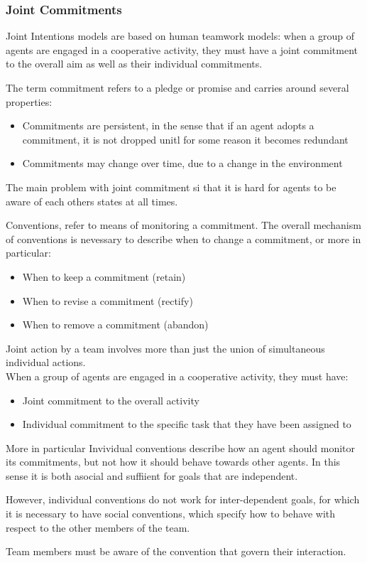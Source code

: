 \subsubsection{Joint Commitments}
Joint Intentions models are based on human teamwork models: when a group of agents are engaged in a cooperative activity, they must have a joint commitment to the overall aim as well as their individual commitments.

The term commitment refers to a pledge or promise and carries around several properties:
\begin{itemize}
\item Commitments are persistent, in the sense that if an agent adopts a commitment, it is not dropped unitl for some reason it becomes redundant
\item Commitments may change over time, due to a change in the environment
\end{itemize}
The main problem with joint commitment si that it is hard for agents to be aware of each others states at all times.

Conventions, refer to means of monitoring a commitment. The overall mechanism of conventions is nevessary to describe when to change a commitment, or more in particular:
\begin{itemize}
\item When to keep a commitment (retain)
\item When to revise a commitment (rectify)
\item When to remove a commitment (abandon)
\end{itemize}

Joint action by a team involves more than just the union of simultaneous individual actions.\\
When a group of agents are engaged in a cooperative activity, they must have:
\begin{itemize}
\item Joint commitment to the overall activity
\item Individual commitment to the specific task that they have been assigned to
\end{itemize}

More in particular Invividual conventions describe how an agent should monitor its commitments, but not how it should behave towards other agents. In this sense it is both asocial and suffiient for goals that are independent.

However, individual conventions do not work for inter-dependent goals, for which it is necessary to have social conventions, which specify how to behave with respect to the other members of the team.

Team members must be aware of the convention that govern their interaction.













